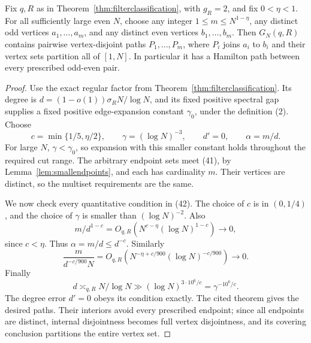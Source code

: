 \begin{theorem}
\label{thm:linkages}
Fix \(q,R\) as in Theorem~\ref{thm:filterclassification},
with \(g_R=2\), and fix \(0<\eta<1\).
For all sufficiently large even \(N\), choose any integer
\(1\leq m\leq N^{1-\eta}\), any distinct odd vertices
\(a_1,\ldots,a_m\), and any distinct even vertices
\(b_1,\ldots,b_m\).
Then \(G_N(q,R)\) contains pairwise vertex-disjoint paths
\(P_1,\ldots,P_m\), where \(P_i\) joins \(a_i\) to \(b_i\)
and their vertex sets partition all of \([1,N]\).
In particular it has a Hamilton path between every prescribed
odd-even pair.
\end{theorem}
\begin{proof}
Use the exact regular factor from
Theorem~\ref{thm:filterclassification}.
Its degree is \(d=(1-o(1))\sigma_R N/\log N\),
and its fixed positive spectral gap supplies a fixed positive
edge-expansion constant \(\gamma_0\), under the definition (2).
Choose
\[
 c=\min\{1/5,\eta/2\},\qquad
 \gamma=(\log N)^{-3},\qquad d'=0,\qquad\alpha=m/d .
\]
For large \(N\), \(\gamma<\gamma_0\), so expansion with this
smaller constant holds throughout the required cut range.
The arbitrary endpoint sets meet (41), by
Lemma~\ref{lem:smallendpoints}, and each has cardinality \(m\).
Their vertices are distinct, so the multiset requirements are
the same.

We now check every quantitative condition in (42).
The choice of \(c\) is in \((0,1/4)\), and the choice of
\(\gamma\) is smaller than \((\log N)^{-2}\).
Also
\[
 m/d^{1-c}
 =O_{q,R}\left(N^{c-\eta}(\log N)^{1-c}\right)\longrightarrow0,
\]
since \(c<\eta\).
Thus \(\alpha=m/d\leq d^{-c}\).
Similarly
\[
 \frac{m}{d^{-c/900}N}
 =O_{q,R}\left(N^{-\eta+c/900}
                    (\log N)^{-c/900}\right)\longrightarrow0.
\]
Finally
\[
 d\asymp_{q,R}N/\log N
       \gg(\log N)^{3\cdot10^6/c}
       =\gamma^{-10^6/c}.
\]
The degree error \(d'=0\) obeys its condition exactly.
The cited theorem gives the desired paths.
Their interiors avoid every prescribed endpoint; since all
endpoints are distinct, internal disjointness becomes full
vertex disjointness, and its covering conclusion partitions
the entire vertex set.
\end{proof}

